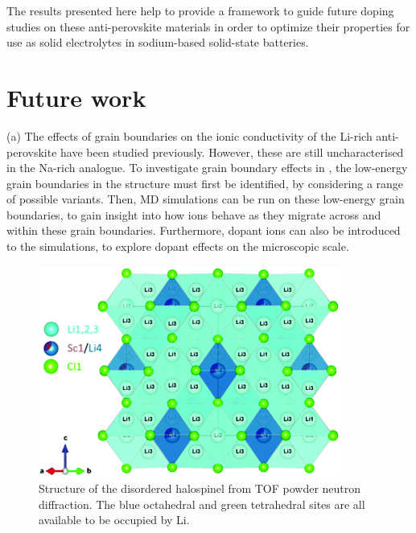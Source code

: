 \documentclass[12pt]{report}
\begin{document}
The results presented here help to provide a framework to guide future doping studies on these anti-perovskite materials in order to optimize their properties for use as solid electrolytes in sodium-based solid-state batteries. 

\section{Future work}

(a) The effects of grain boundaries on the ionic conductivity of the Li-rich anti-perovskite  have been studied previously.\cite{dawson2018b, shen2020} 
However, these are still uncharacterised in the Na-rich analogue.
To investigate grain boundary effects in , the low-energy grain boundaries in the structure must first be identified, by considering a range of possible variants.
Then, MD simulations can be run on these low-energy grain boundaries, to gain insight into how  ions behave as they migrate across and within these grain boundaries.
Furthermore, dopant ions can also be introduced to the simulations, to explore dopant effects on the microscopic scale.

\begin{figure}[h]
    \centering
    \includegraphics[width=10cm]{./figures/halo.png}
    \caption{Structure of the disordered halospinel  from TOF powder neutron diffraction. The blue  octahedral and green  tetrahedral sites are all available to be occupied by Li.\cite{zhou2020}}
    \label{spinel}
\end{figure}
\end{document}
